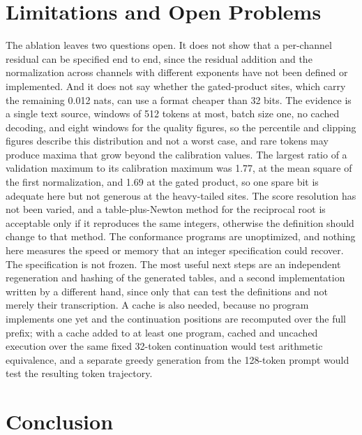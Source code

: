 \documentclass[11pt]{article}
\begin{document}
\section{Limitations and Open Problems}
\label{sec:limits}

The ablation leaves two questions open. It does not show that a per-channel residual can be specified end to end, since the residual addition and the normalization across channels with different exponents have not been defined or implemented. And it does not say whether the gated-product sites, which carry the remaining 0.012 nats, can use a format cheaper than 32 bits. The evidence is a single text source, windows of 512 tokens at most, batch size one, no cached decoding, and eight windows for the quality figures, so the percentile and clipping figures describe this distribution and not a worst case, and rare tokens may produce maxima that grow beyond the calibration values. The largest ratio of a validation maximum to its calibration maximum was 1.77, at the mean square of the first normalization, and 1.69 at the gated product, so one spare bit is adequate here but not generous at the heavy-tailed sites. The score resolution has not been varied, and a table-plus-Newton method for the reciprocal root is acceptable only if it reproduces the same integers, otherwise the definition should change to that method. The conformance programs are unoptimized, and nothing here measures the speed or memory that an integer specification could recover. The specification is not frozen. The most useful next steps are an independent regeneration and hashing of the generated tables, and a second implementation written by a different hand, since only that can test the definitions and not merely their transcription. A cache is also needed, because no program implements one yet and the continuation positions are recomputed over the full prefix; with a cache added to at least one program, cached and uncached execution over the same fixed 32-token continuation would test arithmetic equivalence, and a separate greedy generation from the 128-token prompt would test the resulting token trajectory.

\section{Conclusion}
\end{document}
